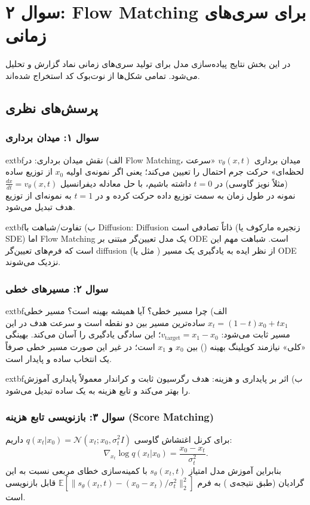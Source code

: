 \renewcommand{\chaptername}{سوال}
\chapter{سوال ۲: Flow Matching برای سری‌های زمانی}

در این بخش نتایج پیاده‌سازی مدل  برای تولید سری‌های زمانی
نماد 
گزارش و تحلیل می‌شود. تمامی شکل‌ها از نوت‌بوک کد استخراج شده‌اند.

\section{پرسش‌های نظری}

\subsection*{سوال ۱: میدان برداری}
	extbf{الف) نقش میدان برداری:}
در Flow Matching، میدان برداری $v_\theta(x,t)$ «سرعت لحظه‌ای» حرکت جرم احتمال را تعیین می‌کند؛ یعنی اگر نمونه‌ی اولیه $x_0$ از توزیع ساده (مثلاً نویز گاوسی) در $t=0$ داشته باشیم، با حل معادله دیفرانسیل
$\frac{dx}{dt}=v_\theta(x,t)$
نمونه در طول زمان به سمت توزیع داده حرکت کرده و در $t=1$ به نمونه‌ای از توزیع هدف تبدیل می‌شود.

	extbf{ب) تفاوت/شباهت با Diffusion:}
Diffusion ذاتاً تصادفی است (زنجیره مارکوف یا SDE) اما Flow Matching یک مدل تعیین‌گر مبتنی بر ODE است. شباهت مهم این است که فرم‌های تعیین‌گر diffusion (مثل  یا ) از نظر ایده به یادگیری یک مسیر ODE نزدیک می‌شوند.

\subsection*{سوال ۲: مسیرهای خطی}
	extbf{الف) چرا مسیر خطی؟ آیا همیشه بهینه است؟}
مسیر خطی $x_t=(1-t)x_0+tx_1$ ساده‌ترین مسیر بین دو نقطه است و سرعت هدف در این مسیر ثابت می‌شود: $v_{\text{target}}=x_1-x_0$؛ این سادگی یادگیری را آسان می‌کند. بهینگی «کلی» نیازمند کوپلینگ بهینه () بین $x_0$ و $x_1$ است؛ در غیر این صورت مسیر خطی صرفاً یک انتخاب ساده و پایدار است.

	extbf{ب) اثر بر پایداری و هزینه:}
هدف رگرسیون ثابت و کراندار معمولاً پایداری آموزش را بهتر می‌کند و تابع هزینه به یک  ساده تبدیل می‌شود.

\subsection*{سوال ۳: بازنویسی تابع هزینه (Score Matching)}
برای کرنل اغتشاش گاوسی
$q(x_t|x_0)=\mathcal{N}(x_t;x_0,\sigma_t^2 I)$
داریم:
\begin{equation}
\nabla_{x_t}\log q(x_t|x_0)=\frac{x_0-x_t}{\sigma_t^2}.
\end{equation}
بنابراین آموزش مدل امتیاز $s_\theta(x_t,t)$ با کمینه‌سازی خطای مربعی نسبت به این گرادیان (طبق نتیجه‌ی ) به فرم
$\mathbb{E}[\|s_\theta(x_t,t)-(x_0-x_t)/\sigma_t^2\|_2^2]$
قابل بازنویسی است.

